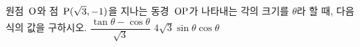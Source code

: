 원점~$\mathrm{O}$와 점~$\mathrm{P}(\sqrt{3}{,}\mkern3mu\mathopen{}-1)$을 지나는 동경~$\mathrm{OP}$가 나타내는 각의 크기를 $\theta$라 할 때, 다음 식의 값을 구하시오.
 $\dfrac{\tan\theta-\cos\theta}{\sqrt{3}}$
 $4\sqrt{3}\sin\theta\cos\theta$

